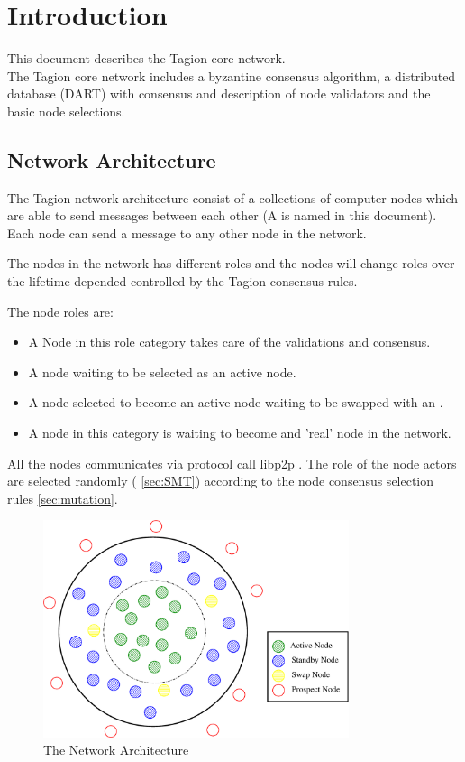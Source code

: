 \section{Introduction}
This document describes the Tagion core network.\\
The Tagion core network includes a byzantine consensus algorithm, a distributed database (DART) with consensus and description of node validators and the basic node selections.
\subsection{Network Architecture} \label{sec:network_architecture}
The Tagion network architecture consist of a collections of computer nodes which are able to send messages between each other (A  is named  in this document). Each node can send a message to any other node in the network.

The nodes in the network has different roles and the nodes will change roles over the lifetime depended controlled by the Tagion consensus rules. 

The node roles are:
\begin{itemize}
	\item[\bfit{Active Node}] A Node in this role category takes care of the validations and consensus.
	\item[\bfit{Standby Node}] A node waiting to be selected as an active node.
	\item[\bfit{Swap Node}] A node selected to become an active node waiting to be swapped with an .  
	\item[\bfit{Prospect Node}] A node in this category is waiting to become and 'real' node in the network.  
	\label{tab:node_roles}
\end{itemize}

All the nodes communicates via protocol call libp2p \cite{libp2p}. The role of the node actors are selected randomly ( \cref{sec:SMT}) according to the node consensus selection rules \cref{sec:mutation}.

\begin{figure}[H]
	\centering
	\includegraphics[width=0.8\textwidth]{fig/network_architecture.eps}
	\caption{The Network Architecture}

	\label{fig:network_architecture}
\end{figure}

